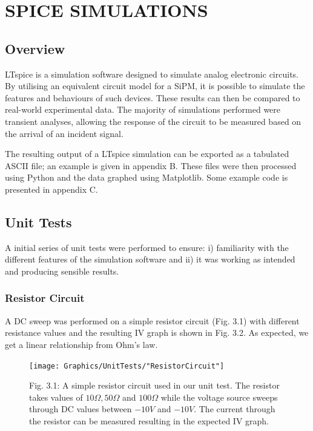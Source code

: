 
\section{SPICE SIMULATIONS}


\subsection{Overview}

LTspice \cite{LTspice} is a simulation software designed to simulate analog electronic circuits. By utilising an equivalent circuit model for a SiPM, it is possible to simulate the features and behaviours of such devices. These results can then be compared to real-world experimental data. The majority of simulations performed were transient analyses, allowing the response of the circuit to be measured based on the arrival of an incident signal.

The resulting output of a LTspice simulation can be exported as a tabulated ASCII file; an example is given in appendix B. These files were then processed using Python and the data graphed using Matplotlib. Some example code is presented in appendix C.

\subsection{Unit Tests}

A initial series of unit tests were performed to ensure: i) familiarity with the different features of the simulation software and ii) it was working as intended and producing sensible results.

\subsubsection{Resistor Circuit}

A DC sweep was performed on a simple resistor circuit (Fig. 3.1) with different resistance values and the resulting IV graph is shown in Fig. 3.2. As expected, we get a linear relationship from Ohm's law.

\begin{figure}[h]
  \centering
  \texttt{[image: Graphics/UnitTests/"ResistorCircuit"]}
  {\caption*{Fig. 3.1: A simple resistor circuit used in our unit test. The resistor takes values of $10\Omega, 50\Omega$ and $100\Omega$ while the voltage source sweeps through DC values between $-10V$ and $-10V$. The current through the resistor can be measured resulting in the expected IV graph.}}
\end{figure}

